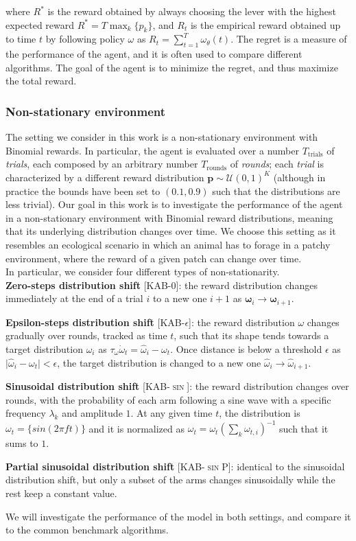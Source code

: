 \noindent where $R^{*}$ is the reward obtained by always choosing the lever with the highest expected reward $R^{*}=T\max_{k}\{p_{k}\}$, and $R_{t}$ is the empirical reward obtained up to time $t$ by following policy $\omega$ as $R_{t}=\sum^{T}_{t=1}\omega_{\theta}(t)$.
The regret is a measure of the performance of the agent, and it is often used to compare different algorithms. The goal of the agent is to minimize the regret, and thus maximize the total reward.

\subsubsection{Non-stationary environment}
\noindent The setting we consider in this work is a non-stationary environment with Binomial rewards. In particular, the agent is evaluated over a number $T_{\text{trials}}$ of \textit{trials}, each composed by an arbitrary number $T_{\text{rounds}}$ of \textit{rounds}; each \textit{trial} is characterized by a different
reward distribution $\mathbf{p}\sim\mathcal{U}(0,1)^{K}$ (although in practice the bounds have been set to $(0.1, 0.9)$ such that the distributions are less trivial). Our goal in this work is to investigate the performance of the agent in a non-stationary environment with Binomial reward distributions, meaning that its underlying distribution changes over time.
We choose this setting as it resembles an ecological scenario in which an animal has to forage in a patchy environment, where the reward of a given patch can change over time. \\
In particular, we consider four different types of non-stationarity.\\
\textbf{Zero-steps distribution shift} [\textsc{KAB-0}]: the reward distribution changes immediately at the end of a trial $i$ to a new one $i+1$ as $\mathbf{\omega}_{i} \to \mathbf{\omega}_{i+1}$.

\noindent  \textbf{Epsilon-steps distribution shift} [\textsc{KAB-$\epsilon$}]: the reward distribution $\omega$ changes gradually over rounds, tracked as time $t$, such that its shape tends towards a target distribution $\hat{\omega}_{i}$ as $\tau_{\omega}\dot{\omega}_{t}=\hat{\omega}_{i}-\omega_{t}$. Once distance is below a threshold $\epsilon$ as $\vert \hat{\omega}_{i} - \omega_{t}\vert < \epsilon$, the target distribution is changed to a new one $\hat{\omega}_{i}\to\hat{\omega}_{i+1}$.

\noindent \textbf{Sinusoidal distribution shift} [\textsc{KAB-$\sin$}]: the reward distribution changes over rounds, with the probability of each arm following a sine wave with a specific frequency $\lambda_{k}$ and amplitude $1$. At any given time $t$, the distribution is $\omega_{t}=\{sin(2\pi f t)\}$ and it is
normalized as $\omega_{t} = \omega_{t}(\sum_{k} \omega_{t,i})^{-1}$ such that it sums to $1$.

\noindent \textbf{Partial sinusoidal distribution shift} [\textsc{KAB-$\sin$P}]: identical to the sinusoidal distribution shift, but only a subset of the arms changes sinusoidally while the rest keep a constant value.


\hfill \break
We will investigate the performance of the model in both settings, and compare it to the common benchmark algorithms.
